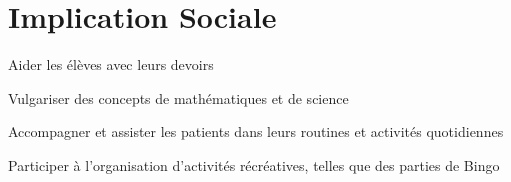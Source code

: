 \documentclass[letterpaper,10pt]{article}
\begin{document}

  \section{Implication Sociale}

  \begin{resume_list}
    \item Aider les élèves avec leurs devoirs
    \item Vulgariser des concepts de mathématiques et de science
  \end{resume_list}
  
\begin{resume_list}
    \item Accompagner et assister les patients dans leurs routines et activités quotidiennes
    \item Participer à l'organisation d'activités récréatives, telles que des parties de Bingo
\end{resume_list}
\end{document}
